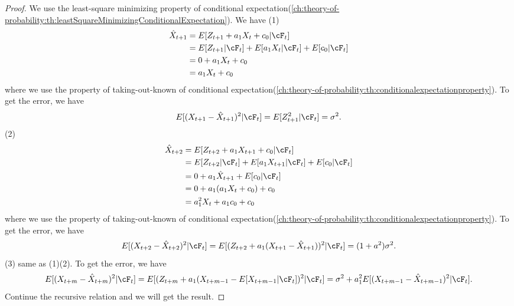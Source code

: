 \begin{proof}
	We use the least-square minimizing property of conditional expectation(\autoref{ch:theory-of-probability:th:leastSquareMinimizingConditionalExpectation}). We have	
	(1) 
	\begin{align*}
	\hat{X}_{t+1} &= E[Z_{t+1} + a_1 X_{t} + c_0|\cF_t] \\
	&= E[Z_{t+1}|\cF_t] + E[a_1 X_{t}|\cF_t] + E[c_0|\cF_t] \\
	&=0 + a_1 X_{t} + c_0 \\
	&=a_1 X_{t} + c_0
	\end{align*}
	where we use the property of taking-out-known of conditional expectation(\autoref{ch:theory-of-probability:th:conditionalexpectationproperty}).
	To get the error, we have
	$$E[(X_{t+1} - \hat{X}_{t+1})^2|\cF_t] = E[Z_{t+1}^2|\cF_t] = \sigma^2.$$
	(2) 
	\begin{align*}
	\hat{X}_{t+2} &= E[Z_{t+2} + a_1 X_{t+1} + c_0|\cF_t] \\
	&= E[Z_{t+2}|\cF_t] + E[a_1 X_{t+1}|\cF_t] + E[c_0|\cF_t] \\
	&= 0 + a_1\hat{X}_{t+1} + E[c_0|\cF_t] \\
	&=0 + a_1(a_1X_t + c_0) + c_0 \\
	&= a_1^2 X_t + a_1c_0 + c_0
	\end{align*}
	where we use the property of taking-out-known of conditional expectation(\autoref{ch:theory-of-probability:th:conditionalexpectationproperty}).
	To get the error, we have
	$$E[(X_{t+2} - \hat{X}_{t+2})^2|\cF_t] = E[(Z_{t+2} + a_1(X_{t+1} - \hat{X}_{t+1}))^2|\cF_t] = (1 + a^2)\sigma^2.$$
	(3) same as (1)(2). 
	To get the error, we have
	$$E[(X_{t+m} - \hat{X}_{t+m})^2|\cF_t] = E[(Z_{t+m} + a_1(X_{t+m-1} - E[X_{t+m-1}|\cF_t])^2|\cF_t] =\sigma^2 + a_1^2E[(X_{t+m-1} - \hat{X}_{t+m-1})^2|\cF_t] .$$
	Continue the recursive relation and we will get the result.
\end{proof}


